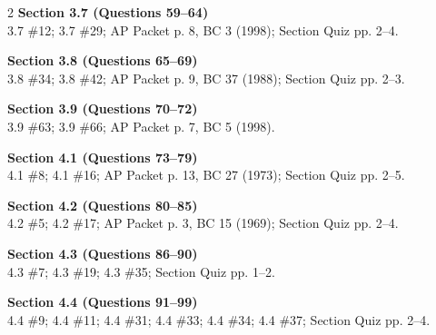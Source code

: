 \documentclass[11pt]{article}
\begin{document}
\begin{multicols}{2}
\smallskip
\noindent\textbf{Section 3.7 (Questions 59--64)}\\
3.7 \#12; 3.7 \#29; AP Packet p. 8, BC 3 (1998); Section Quiz pp. 2--4.

\smallskip
\noindent\textbf{Section 3.8 (Questions 65--69)}\\
3.8 \#34; 3.8 \#42; AP Packet p. 9, BC 37 (1988); Section Quiz pp. 2--3.

\smallskip
\noindent\textbf{Section 3.9 (Questions 70--72)}\\
3.9 \#63; 3.9 \#66; AP Packet p. 7, BC 5 (1998).

\smallskip
\noindent\textbf{Section 4.1 (Questions 73--79)}\\
4.1 \#8; 4.1 \#16; AP Packet p. 13, BC 27 (1973); Section Quiz pp. 2--5.

\smallskip
\noindent\textbf{Section 4.2 (Questions 80--85)}\\
4.2 \#5; 4.2 \#17; AP Packet p. 3, BC 15 (1969); Section Quiz pp. 2--4.

\smallskip
\noindent\textbf{Section 4.3 (Questions 86--90)}\\
4.3 \#7; 4.3 \#19; 4.3 \#35; Section Quiz pp. 1--2.

\smallskip
\noindent\textbf{Section 4.4 (Questions 91--99)}\\
4.4 \#9; 4.4 \#11; 4.4 \#31; 4.4 \#33; 4.4 \#34; 4.4 \#37; Section Quiz pp. 2--4.
\end{multicols}
\end{document}
